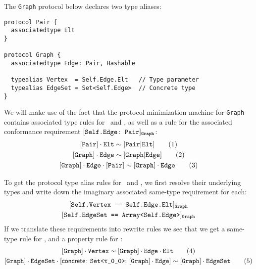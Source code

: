 \documentclass[../generics]{subfiles}
\begin{document}
\begin{example}
The \texttt{Graph} protocol below declares two type aliases:
\begin{Verbatim}
protocol Pair {
  associatedtype Elt
}

protocol Graph {
  associatedtype Edge: Pair, Hashable

  typealias Vertex  = Self.Edge.Elt   // Type parameter
  typealias EdgeSet = Set<Self.Edge>  // Concrete type
}
\end{Verbatim}
We will make use of the fact that the protocol minimization machine for \texttt{Graph} contains associated type rules for \nEl\ and \nEd, as well as a rule for the associated conformance requirement $[\texttt{Self.Edge:~Pair}]_{\texttt{Graph}}$:
\begin{gather*}
\AssocRule{Pair}{Elt}\tag{1}\\
\AssocRule{Graph}{Edge}\tag{2}\\
\ConfRule{\pGraph\cdot\nEd}{\pPair}\tag{3}
\end{gather*}

To get the protocol type alias rules for \nV\ and \nES, we first resolve their underlying types and write down the imaginary associated same-type requirement for each:
\begin{gather*}
\AssocSameReq{Self.Vertex}{Self.Edge.Elt}{Graph}\\
\AssocSameReq{Self.EdgeSet}{Array<Self.Edge>}{Graph}
\end{gather*}
If we translate these requirements into rewrite rules we see that we get a same-type rule for \nV, and a property rule for \nES:
\begin{gather*}
\SameRule{\pGraph \cdot \nV}{\pGraph \cdot \nEd \cdot \nEl}\tag{4}\\
\ConfRule{\pGraph \cdot \nES}{\concretesym{\texttt{Set<\rT>};\, \pGraph\cdot\nEd}}\tag{5}
\end{gather*}


\end{example}
\end{document}
